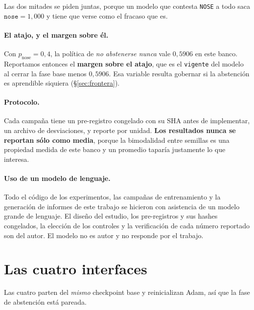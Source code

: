 \documentclass[11pt,a4paper]{article}
\begin{document}
\begin{center}
\end{center}

Las dos mitades se piden juntas, porque un modelo que contesta \texttt{NOSE} a todo saca
$\texttt{nose} = 1{,}000$ y tiene que verse como el fracaso que es.

\paragraph{El atajo, y el margen sobre él.} Con $p_{\mathrm{nose}} = 0{,}4$, la política de
\emph{no abstenerse nunca} vale $0{,}5906$ en este banco. Reportamos entonces el \textbf{margen sobre
el atajo}, que es el \texttt{vigente} del modelo al cerrar la fase base menos $0{,}5906$. Esa
variable resulta gobernar si la abstención es aprendible siquiera (§\ref{sec:frontera}).

\paragraph{Protocolo.} Cada campaña tiene un pre-registro congelado con su SHA antes de implementar,
un archivo de desviaciones, y reporte por unidad. \textbf{Los resultados nunca se reportan sólo como
media}, porque la bimodalidad entre semillas es una propiedad medida de este banco y un promedio
taparía justamente lo que interesa.

\paragraph{Uso de un modelo de lenguaje.} Todo el código de los experimentos, las campañas de
entrenamiento y la generación de informes de este trabajo se hicieron con asistencia de un modelo
grande de lenguaje. El diseño del estudio, los pre-registros y sus hashes congelados, la elección de
los controles y la verificación de cada número reportado son del autor. El modelo no es autor y no
responde por el trabajo.

\section{Las cuatro interfaces}

Las cuatro parten del \emph{mismo} checkpoint base y reinicializan Adam, así que la fase de
abstención está pareada.
\end{document}
